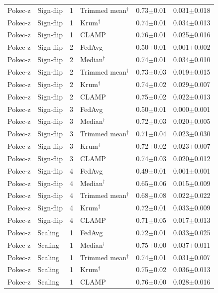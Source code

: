\begin{longtable}{llclcc}
Pokec-z & Sign-flip & 1 & Trimmed mean$^\dagger$ & 0.73$\pm$0.01 & 0.031$\pm$0.018 \\
Pokec-z & Sign-flip & 1 & Krum$^\dagger$ & 0.74$\pm$0.01 & 0.034$\pm$0.013 \\
Pokec-z & Sign-flip & 1 & CLAMP & 0.76$\pm$0.01 & 0.025$\pm$0.016 \\
Pokec-z & Sign-flip & 2 & FedAvg & 0.50$\pm$0.01 & 0.001$\pm$0.002 \\
Pokec-z & Sign-flip & 2 & Median$^\dagger$ & 0.74$\pm$0.01 & 0.034$\pm$0.010 \\
Pokec-z & Sign-flip & 2 & Trimmed mean$^\dagger$ & 0.73$\pm$0.03 & 0.019$\pm$0.015 \\
Pokec-z & Sign-flip & 2 & Krum$^\dagger$ & 0.74$\pm$0.02 & 0.029$\pm$0.007 \\
Pokec-z & Sign-flip & 2 & CLAMP & 0.75$\pm$0.02 & 0.022$\pm$0.013 \\
Pokec-z & Sign-flip & 3 & FedAvg & 0.50$\pm$0.01 & 0.000$\pm$0.001 \\
Pokec-z & Sign-flip & 3 & Median$^\dagger$ & 0.72$\pm$0.03 & 0.020$\pm$0.005 \\
Pokec-z & Sign-flip & 3 & Trimmed mean$^\dagger$ & 0.71$\pm$0.04 & 0.023$\pm$0.030 \\
Pokec-z & Sign-flip & 3 & Krum$^\dagger$ & 0.72$\pm$0.02 & 0.023$\pm$0.007 \\
Pokec-z & Sign-flip & 3 & CLAMP & 0.74$\pm$0.03 & 0.020$\pm$0.012 \\
Pokec-z & Sign-flip & 4 & FedAvg & 0.49$\pm$0.01 & 0.001$\pm$0.001 \\
Pokec-z & Sign-flip & 4 & Median$^\dagger$ & 0.65$\pm$0.06 & 0.015$\pm$0.009 \\
Pokec-z & Sign-flip & 4 & Trimmed mean$^\dagger$ & 0.68$\pm$0.08 & 0.022$\pm$0.022 \\
Pokec-z & Sign-flip & 4 & Krum$^\dagger$ & 0.72$\pm$0.01 & 0.033$\pm$0.009 \\
Pokec-z & Sign-flip & 4 & CLAMP & 0.71$\pm$0.05 & 0.017$\pm$0.013 \\
Pokec-z & Scaling & 1 & FedAvg & 0.72$\pm$0.01 & 0.033$\pm$0.025 \\
Pokec-z & Scaling & 1 & Median$^\dagger$ & 0.75$\pm$0.00 & 0.037$\pm$0.011 \\
Pokec-z & Scaling & 1 & Trimmed mean$^\dagger$ & 0.74$\pm$0.01 & 0.031$\pm$0.007 \\
Pokec-z & Scaling & 1 & Krum$^\dagger$ & 0.75$\pm$0.02 & 0.036$\pm$0.013 \\
Pokec-z & Scaling & 1 & CLAMP & 0.76$\pm$0.00 & 0.028$\pm$0.016 \\

\end{longtable}

